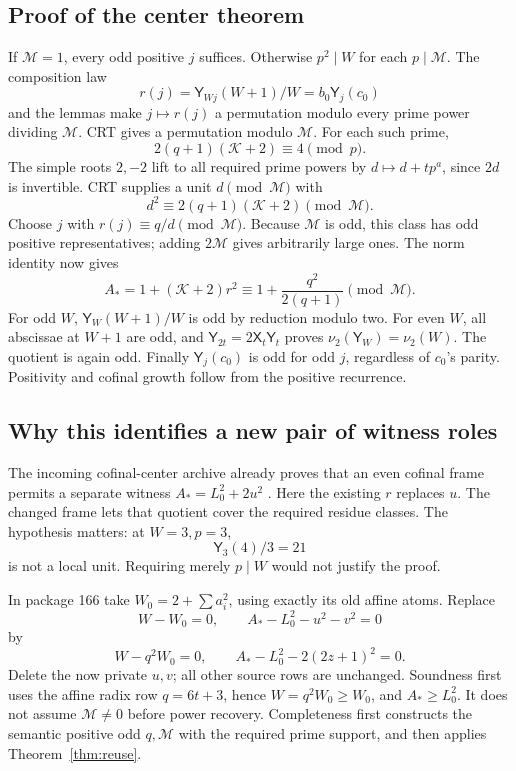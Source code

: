 \documentclass[11pt]{article}
\theoremstyle{remark}
\newcommand{\PellX}{\mathsf X}
\newcommand{\PellY}{\mathsf Y}
\begin{document}
\subsection{Proof of the center theorem}
If \(\mathcal M=1\), every odd positive \(j\) suffices.
Otherwise \(p^2\mid W\) for each \(p\mid\mathcal M\).
The composition law
\[
 r(j)=\PellY_{Wj}(W+1)/W=b_0\PellY_j(c_0)
\]
and the lemmas make \(j\mapsto r(j)\) a permutation modulo every prime
power dividing \(\mathcal M\). CRT gives a permutation modulo \(\mathcal M\).
For each such prime,
\[
 2(q+1)(\mathcal K+2)\equiv4\pmod p.
\]
The simple roots \(2,-2\) lift to all required prime powers by
\(d\mapsto d+tp^a\), since \(2d\) is invertible.
CRT supplies a unit \(d\pmod{\mathcal M}\) with
\[
 d^2\equiv2(q+1)(\mathcal K+2)\pmod{\mathcal M}.
\]
Choose \(j\) with \(r(j)\equiv q/d\pmod{\mathcal M}\).
Because \(\mathcal M\) is odd, this class has odd positive representatives;
adding \(2\mathcal M\) gives arbitrarily large ones.
The norm identity now gives
\[
 A_*=1+(\mathcal K+2)r^2
       \equiv1+\frac{q^2}{2(q+1)}\pmod{\mathcal M}.
\]
For odd \(W\), \(\PellY_W(W+1)/W\) is odd by reduction modulo two.
For even \(W\), all abscissae at \(W+1\) are odd, and
\(\PellY_{2t}=2\PellX_t\PellY_t\) proves
\(\nu_2(\PellY_W)=\nu_2(W)\). The quotient is again odd.
Finally \(\PellY_j(c_0)\) is odd for odd \(j\), regardless of \(c_0\)'s
parity. Positivity and cofinal growth follow from the positive recurrence.

\subsection{Why this identifies a new pair of witness roles}
The incoming cofinal-center archive already proves that an even cofinal
frame permits a separate witness \(A_*=L_0^2+2u^2\)
\cite{incomingCofinal}. Here the existing \(r\) replaces \(u\).
The changed frame lets that quotient cover the required residue classes.
The hypothesis matters: at \(W=3,p=3\),
\[
 \PellY_3(4)/3=21
\]
is not a local unit. Requiring merely \(p\mid W\) would not justify the proof.

In package 166 take \(W_0=2+\sum a_i^2\), using exactly its old affine atoms.
Replace
\[
 W-W_0=0,\qquad A_*-L_0^2-u^2-v^2=0
\]
by
\[
 W-q^2W_0=0,\qquad A_*-L_0^2-2(2z+1)^2=0.       \tag{Reuse}
\]
Delete the now private \(u,v\); all other source rows are unchanged.
Soundness first uses the affine radix row \(q=6t+3\), hence
\(W=q^2W_0\ge W_0\), and \(A_*\ge L_0^2\).
It does not assume \(\mathcal M\ne0\) before power recovery.
Completeness first constructs the semantic positive odd \(q,\mathcal M\)
with the required prime support, and then applies Theorem~\ref{thm:reuse}.
\end{document}
